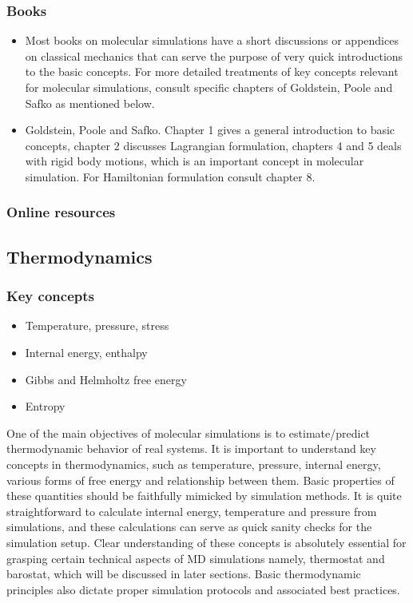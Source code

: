 \documentclass[9pt,bestpractices]{livecoms}
\begin{document}
\subsubsection{Books}
\begin{itemize}
\item Most books on molecular simulations have a short discussions or appendices on classical mechanics that can serve the purpose of very quick introductions to the basic concepts.
For more detailed treatments of key concepts relevant for molecular simulations, consult specific chapters of Goldstein, Poole and Safko as mentioned below.

\item Goldstein, Poole and Safko. Chapter 1 gives a general introduction to basic concepts, chapter 2 discusses Lagrangian formulation, chapters 4 and 5 deals with rigid body motions, which is an important concept in molecular simulation. For Hamiltonian formulation consult chapter 8.
\end{itemize}

\subsubsection{Online resources}


\subsection{Thermodynamics}
\label{sec:thermodynamics}
\subsubsection{Key concepts}
\begin{itemize}
\item Temperature, pressure, stress
\item Internal energy, enthalpy
\item Gibbs and Helmholtz free energy
\item Entropy
\end{itemize}

One of the main objectives of molecular simulations is to estimate/predict thermodynamic behavior of real systems. 
It is important to understand key concepts in thermodynamics, such as temperature, pressure, internal energy, various forms of free energy and relationship between them. 
Basic properties of these quantities should be faithfully mimicked by simulation methods. 
It is quite straightforward to calculate internal energy, temperature and pressure from simulations, and these calculations can serve as quick sanity checks for the simulation setup. 
Clear understanding of these concepts is absolutely essential for grasping certain technical aspects of MD simulations namely, thermostat and barostat, which will be discussed in later sections. 
Basic thermodynamic principles also dictate proper simulation protocols and associated best practices.
\end{document}
